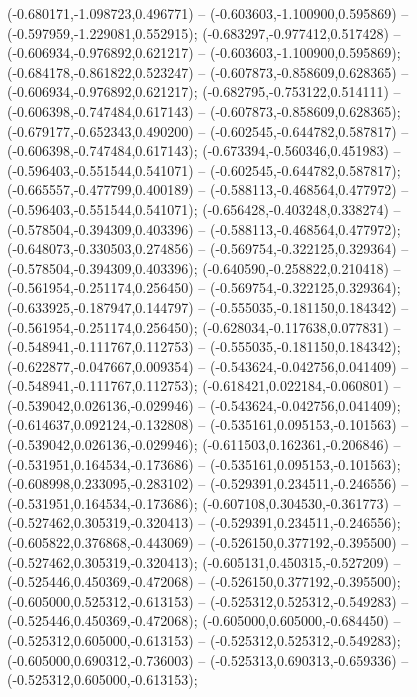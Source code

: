  (-0.680171,-1.098723,0.496771) -- (-0.603603,-1.100900,0.595869) -- (-0.597959,-1.229081,0.552915);
 (-0.683297,-0.977412,0.517428) -- (-0.606934,-0.976892,0.621217) -- (-0.603603,-1.100900,0.595869);
 (-0.684178,-0.861822,0.523247) -- (-0.607873,-0.858609,0.628365) -- (-0.606934,-0.976892,0.621217);
 (-0.682795,-0.753122,0.514111) -- (-0.606398,-0.747484,0.617143) -- (-0.607873,-0.858609,0.628365);
 (-0.679177,-0.652343,0.490200) -- (-0.602545,-0.644782,0.587817) -- (-0.606398,-0.747484,0.617143);
 (-0.673394,-0.560346,0.451983) -- (-0.596403,-0.551544,0.541071) -- (-0.602545,-0.644782,0.587817);
 (-0.665557,-0.477799,0.400189) -- (-0.588113,-0.468564,0.477972) -- (-0.596403,-0.551544,0.541071);
 (-0.656428,-0.403248,0.338274) -- (-0.578504,-0.394309,0.403396) -- (-0.588113,-0.468564,0.477972);
 (-0.648073,-0.330503,0.274856) -- (-0.569754,-0.322125,0.329364) -- (-0.578504,-0.394309,0.403396);
 (-0.640590,-0.258822,0.210418) -- (-0.561954,-0.251174,0.256450) -- (-0.569754,-0.322125,0.329364);
 (-0.633925,-0.187947,0.144797) -- (-0.555035,-0.181150,0.184342) -- (-0.561954,-0.251174,0.256450);
 (-0.628034,-0.117638,0.077831) -- (-0.548941,-0.111767,0.112753) -- (-0.555035,-0.181150,0.184342);
 (-0.622877,-0.047667,0.009354) -- (-0.543624,-0.042756,0.041409) -- (-0.548941,-0.111767,0.112753);
 (-0.618421,0.022184,-0.060801) -- (-0.539042,0.026136,-0.029946) -- (-0.543624,-0.042756,0.041409);
 (-0.614637,0.092124,-0.132808) -- (-0.535161,0.095153,-0.101563) -- (-0.539042,0.026136,-0.029946);
 (-0.611503,0.162361,-0.206846) -- (-0.531951,0.164534,-0.173686) -- (-0.535161,0.095153,-0.101563);
 (-0.608998,0.233095,-0.283102) -- (-0.529391,0.234511,-0.246556) -- (-0.531951,0.164534,-0.173686);
 (-0.607108,0.304530,-0.361773) -- (-0.527462,0.305319,-0.320413) -- (-0.529391,0.234511,-0.246556);
 (-0.605822,0.376868,-0.443069) -- (-0.526150,0.377192,-0.395500) -- (-0.527462,0.305319,-0.320413);
 (-0.605131,0.450315,-0.527209) -- (-0.525446,0.450369,-0.472068) -- (-0.526150,0.377192,-0.395500);
 (-0.605000,0.525312,-0.613153) -- (-0.525312,0.525312,-0.549283) -- (-0.525446,0.450369,-0.472068);
 (-0.605000,0.605000,-0.684450) -- (-0.525312,0.605000,-0.613153) -- (-0.525312,0.525312,-0.549283);
 (-0.605000,0.690312,-0.736003) -- (-0.525313,0.690313,-0.659336) -- (-0.525312,0.605000,-0.613153);
